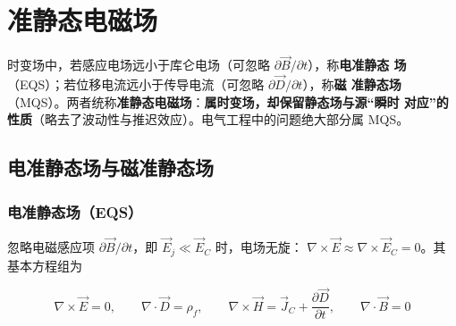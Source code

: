 
\makeatletter
{}
\makeatother

\chapter{准静态电磁场}

时变场中，若感应电场远小于库仑电场（可忽略 $\partial\vec{B}/\partial t$），称\textbf{电准静态
场}（EQS）；若位移电流远小于传导电流（可忽略 $\partial\vec{D}/\partial t$），称\textbf{磁
准静态场}（MQS）。两者统称\textbf{准静态电磁场}：\textbf{属时变场，却保留静态场与源“瞬时
对应”的性质}（略去了波动性与推迟效应）。电气工程中的问题绝大部分属 MQS。

\section{电准静态场与磁准静态场}

\subsection{电准静态场（EQS）}

忽略电磁感应项 $\partial\vec{B}/\partial t$，即 $\vec{E}_j\ll\vec{E}_C$ 时，电场无旋：
$\nabla\times\vec{E}\approx\nabla\times\vec{E}_C=0$。其基本方程组为

\begin{formulaBox}
\[
\nabla\times\vec{E}=0,
\qquad
\nabla\cdot\vec{D}=\rho_f,
\qquad
\nabla\times\vec{H}=\vec{J}_C+\frac{\partial\vec{D}}{\partial t},
\qquad
\nabla\cdot\vec{B}=0
\]
\end{formulaBox}

